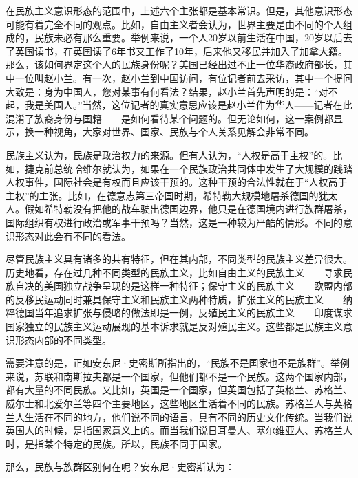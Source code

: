 在民族主义意识形态的范围中，上述六个主张都是基本常识。但是，其他意识形态可能有着完全不同的观点。比如，自由主义者会认为，世界主要是由不同的个人组成的，民族未必有那么重要。举例来说，一个人20岁以前生活在中国，20岁以后去了英国读书，在英国读了6年书又工作了10年，后来他又移民并加入了加拿大籍。那么，该如何界定这个人的民族身份呢？美国已经出过不止一位华裔政府部长，其中一位叫赵小兰。有一次，赵小兰到中国访问，有位记者前去采访，其中一个提问大致是：身为中国人，您对某事有何看法？结果，赵小兰首先声明的是：“对不起，我是美国人。”当然，这位记者的真实意思应该是赵小兰作为华人——记者在此混淆了族裔身份与国籍——是如何看待某个问题的。但无论如何，这一案例都显示，换一种视角，大家对世界、国家、民族与个人关系见解会非常不同。

民族主义认为，民族是政治权力的来源。但有人认为，“人权是高于主权”的。比如，捷克前总统哈维尔就认为，如果在一个民族政治共同体中发生了大规模的践踏人权事件，国际社会是有权而且应该干预的。这种干预的合法性就在于“人权高于主权”的主张。比如，在德意志第三帝国时期，希特勒大规模地屠杀德国的犹太人。假如希特勒没有把他的战车驶出德国边界，他只是在德国境内进行族群屠杀，国际组织有权进行政治或军事干预吗？当然，这是一种较为严酷的情形。不同的意识形态对此会有不同的看法。

尽管民族主义具有诸多的共有特征，但在其内部，不同类型的民族主义差异很大。历史地看，存在过几种不同类型的民族主义，比如自由主义的民族主义——寻求民族自决的美国独立战争呈现的是这样一种特征；保守主义的民族主义——欧盟内部的反移民运动同时兼具保守主义和民族主义两种特质，扩张主义的民族主义——纳粹德国当年追求扩张与侵略的做法即是一例，反殖民主义的民族主义——印度谋求国家独立的民族主义运动展现的基本诉求就是反对殖民主义。这些都是民族主义意识形态内部的不同类型。

需要注意的是，正如安东尼·史密斯所指出的，“民族不是国家也不是族群”。举例来说，苏联和南斯拉夫都是一个国家，但他们都不是一个民族。这两个国家内部，都有大量的不同民族。又比如，英国是一个国家，但英国包括了英格兰、苏格兰、威尔士和北爱尔兰等四个主要地区，这些地区生活着不同的民族。苏格兰人与英格兰人生活在不同的地方，他们说不同的语言，具有不同的历史文化传统。当我们说英国人的时候，是指国家意义上的。而当我们说日耳曼人、塞尔维亚人、苏格兰人时，是指某个特定的民族。所以，民族不同于国家。

那么，民族与族群区别何在呢？安东尼·史密斯认为：


